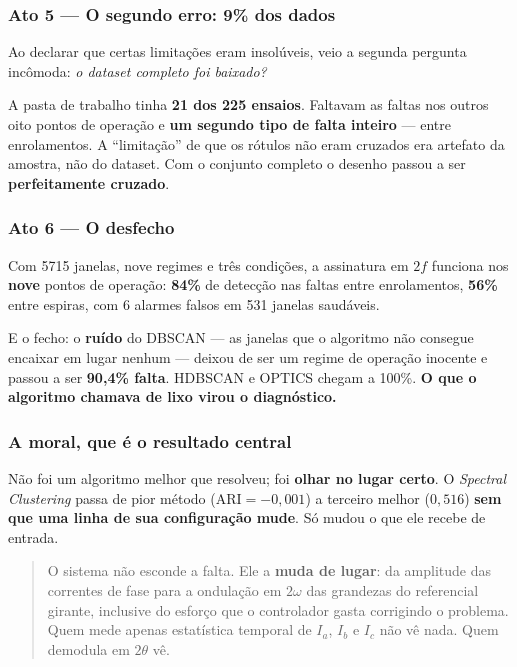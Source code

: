 \documentclass[12pt,a4paper]{article}
\begin{document}
\subsubsection*{Ato 5 --- O segundo erro: 9\% dos dados}

Ao declarar que certas limitações eram insolúveis, veio a segunda pergunta incômoda: \emph{o dataset completo foi baixado?}

A pasta de trabalho tinha \textbf{21 dos 225 ensaios}. Faltavam as faltas nos outros oito pontos de operação e \textbf{um segundo tipo de falta inteiro} --- entre enrolamentos. A ``limitação'' de que os rótulos não eram cruzados era artefato da amostra, não do dataset. Com o conjunto completo o desenho passou a ser \textbf{perfeitamente cruzado}.

\subsubsection*{Ato 6 --- O desfecho}

Com 5715 janelas, nove regimes e três condições, a assinatura em $2f$ funciona nos \textbf{nove} pontos de operação: \textbf{84\%} de detecção nas faltas entre enrolamentos, \textbf{56\%} entre espiras, com 6 alarmes falsos em 531 janelas saudáveis.

E o fecho: o \textbf{ruído} do DBSCAN --- as janelas que o algoritmo não consegue encaixar em lugar nenhum --- deixou de ser um regime de operação inocente e passou a ser \textbf{90,4\% falta}. HDBSCAN e OPTICS chegam a 100\%. \textbf{O que o algoritmo chamava de lixo virou o diagnóstico.}

\subsubsection*{A moral, que é o resultado central}

Não foi um algoritmo melhor que resolveu; foi \textbf{olhar no lugar certo}. O \emph{Spectral Clustering} passa de pior método ($\text{ARI} = -0{,}001$) a terceiro melhor ($0{,}516$) \textbf{sem que uma linha de sua configuração mude}. Só mudou o que ele recebe de entrada.

\begin{quote}
\noindent O sistema não esconde a falta. Ele a \textbf{muda de lugar}: da amplitude das correntes de fase para a ondulação em $2\omega$ das grandezas do referencial girante, inclusive do esforço que o controlador gasta corrigindo o problema. Quem mede apenas estatística temporal de $I_a$, $I_b$ e $I_c$ não vê nada. Quem demodula em $2\theta$ vê.
\end{quote}
\end{document}
